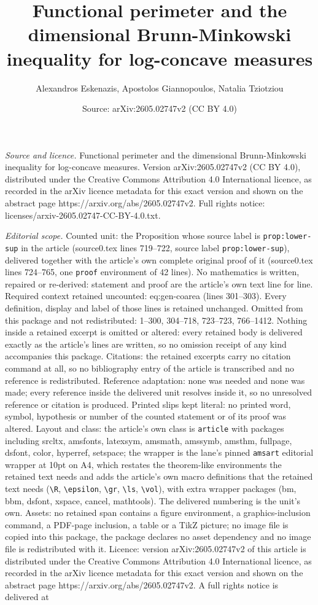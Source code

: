 \documentclass[10pt,a4paper]{amsart}
\title[Functional perimeter and the dimensional Brunn-Minkowski ine]{Functional perimeter and the dimensional Brunn-Minkowski inequality for log-concave measures}
\author{Alexandros Eskenazis, Apostolos Giannopoulos, Natalia Tziotziou}
\date{Source: arXiv:2605.02747v2 (CC BY 4.0)}
\begin{document}
\maketitle

\noindent\emph{Source and licence.} Functional perimeter and the dimensional Brunn-Minkowski inequality for log-concave measures. Version arXiv:2605.02747v2 (CC BY 4.0), distributed under the Creative Commons Attribution 4.0 International licence, as recorded in the arXiv licence metadata for this exact version and shown on the abstract page https://arxiv.org/abs/2605.02747v2. Full rights notice: licenses/arxiv-2605.02747-CC-BY-4.0.txt.\par\smallskip

\noindent\textit{Editorial scope.} Counted unit: the Proposition whose source label is \texttt{prop:lower-sup} in the article (source0.tex lines 719--722, source label \texttt{prop:lower-sup}), delivered together with the article's own complete original proof of it (source0.tex lines 724--765, one \texttt{proof} environment of 42 lines). No mathematics is written, repaired or re-derived: statement and proof are the article's own text line for line. Required context retained uncounted: eq:gen-coarea (lines 301--303). Every definition, display and label of those lines is retained unchanged. Omitted from this package and not redistributed: 1--300, 304--718, 723--723, 766--1412. Nothing inside a retained excerpt is omitted or altered: every retained body is delivered exactly as the article's lines are written, so no omission receipt of any kind accompanies this package. Citations: the retained excerpts carry no citation command at all, so no bibliography entry of the article is transcribed and no reference is redistributed. Reference adaptation: none was needed and none was made; every reference inside the delivered unit resolves inside it, so no unresolved reference or citation is produced. Printed slips kept literal: no printed word, symbol, hypothesis or number of the counted statement or of its proof was altered. Layout and class: the article's own class is \texttt{article} with packages including srcltx, amsfonts, latexsym, amsmath, amssymb, amsthm, fullpage, dsfont, color, hyperref, setspace; the wrapper is the lane's pinned \texttt{amsart} editorial wrapper at 10pt on A4, which restates the theorem-like environments the retained text needs and adds the article's own macro definitions that the retained text needs (\texttt{\textbackslash R}, \texttt{\textbackslash epsilon}, \texttt{\textbackslash gr}, \texttt{\textbackslash ls}, \texttt{\textbackslash vol}), with extra wrapper packages (bm, bbm, dsfont, xspace, cancel, mathtools). The delivered numbering is the unit's own. Assets: no retained span contains a figure environment, a graphics-inclusion command, a PDF-page inclusion, a table or a TikZ picture; no image file is copied into this package, the package declares no asset dependency and no image file is redistributed with it. Licence: version arXiv:2605.02747v2 of this article is distributed under the Creative Commons Attribution 4.0 International licence, as recorded in the arXiv licence metadata for this exact version and shown on the abstract page https://arxiv.org/abs/2605.02747v2. A full rights notice is delivered at 
\end{document}
